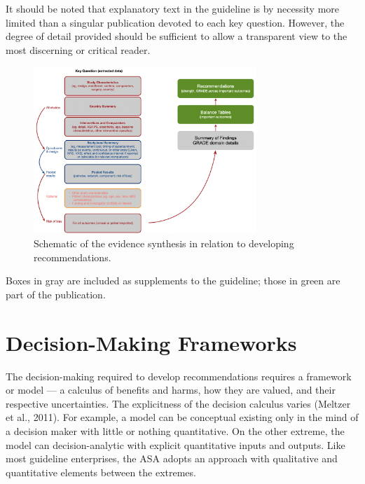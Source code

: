 \documentclass[
  letterpaper,
  DIV=11,
  numbers=noendperiod]{scrreprt}
\begin{document}
It should be noted that explanatory text in the guideline is by
necessity more limited than a singular publication devoted to each key
question. However, the degree of detail provided should be sufficient to
allow a transparent view to the most discerning or critical reader.

\begin{figure}

\caption{\label{fig-structure}Schematic of the evidence synthesis in
relation to developing recommendations.}

\includegraphics[width=0.75\textwidth,height=\textheight]{assets/structure.png} \hfill{}

\end{figure}

Boxes in gray are included as supplements to the guideline; those in
green are part of the publication.

\hypertarget{decision-making-frameworks}{%
\section{Decision-Making Frameworks}\label{decision-making-frameworks}}

The decision-making required to develop recommendations requires a
framework or model --- a calculus of benefits and harms, how they are
valued, and their respective uncertainties. The explicitness of the
decision calculus varies (Meltzer et al., 2011). For example, a model
can be conceptual existing only in the mind of a decision maker with
little or nothing quantitative. On the other extreme, the model can
decision-analytic with explicit quantitative inputs and outputs. Like
most guideline enterprises, the ASA adopts an approach with qualitative
and quantitative elements between the extremes.
\end{document}
